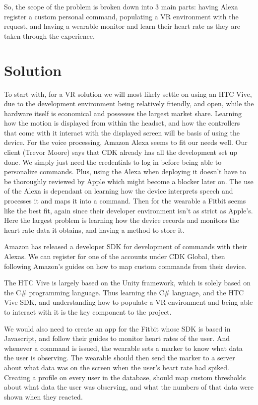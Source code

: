 \documentclass[onecolumn, draftclsnofoot,10pt, compsoc]{IEEEtran}
\begin{document}
So, the scope of the problem is broken down into 3 main parts: having Alexa register a custom personal command, populating a VR environment with the request, and having a wearable monitor and learn their heart rate as they are taken through the experience. 


\section {Solution}
To start with, for a VR solution we will most likely settle on using an HTC Vive, due to the development environment being relatively friendly, and open, while the hardware itself is economical and possesses the largest market share. Learning how the motion is displayed from within the headset, and how the controllers that come with it interact with the displayed screen will be basis of using the device. For the voice processing, Amazon Alexa seems to fit our needs well. Our client (Trevor Moore) says that CDK already has all the development set up done. We simply just need the credentials to log in before being able to personalize commands. Plus, using the Alexa when deploying it doesn’t have to be thoroughly reviewed by Apple which might become a blocker later on. The use of the Alexa is dependant on learning how the device interprets speech and processes it and maps it into a command. Then for the wearable a Fitbit seems like the best fit, again since their developer environment isn’t as strict as Apple's. Here the largest problem is learning how the device records and monitors the heart rate data it obtains, and having a method to store it. 

Amazon has released a developer SDK for development of commands with their Alexas. We can register for one of the accounts under CDK Global, then following Amazon’s guides on how to map custom commands from their device. 

The HTC Vive is largely based on the Unity framework, which is solely based on the C\# programming language. Thus learning the C\# language, and the HTC Vive SDK, and understanding how to populate a VR environment and being able to interact with it is the key component to the project.

We would also need to create an app for the Fitbit whose SDK is based in Javascript, and follow their guides to monitor heart rates of the user. And whenever a command is issued, the wearable sets a marker to know what data the user is observing. The wearable should then send the marker to a server about what data was on the screen when the user’s heart rate had spiked. Creating a profile on every user in the database, should map custom thresholds about what data the user was observing, and what the numbers of that data were shown when they reacted. 
\end{document}
